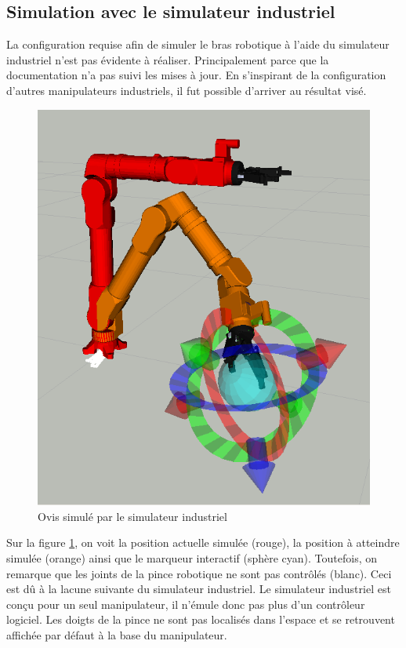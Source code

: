 \subsection{Simulation avec le simulateur industriel}
La configuration requise afin de simuler le bras robotique à l'aide du simulateur industriel n'est pas évidente à réaliser. Principalement parce que la documentation n'a pas suivi les mises à jour. En s'inspirant de la configuration d'autres manipulateurs industriels, il fut possible d'arriver au résultat visé.

\begin{figure}[H]
    \centering
    \includegraphics[scale=0.5]{Figures/ovis_moveit_industrial_sim}
    \caption{Ovis simulé par le simulateur industriel}
    \label{fig:ovis_industrial_sim}
\end{figure}

Sur la figure \ref{fig:ovis_industrial_sim}, on voit la position actuelle simulée (rouge), la position à atteindre simulée (orange) ainsi que le marqueur interactif (sphère cyan). Toutefois, on remarque que les joints de la pince robotique ne sont pas contrôlés (blanc). Ceci est dû à la lacune suivante du simulateur industriel. Le simulateur industriel est conçu pour un seul manipulateur, il n'émule donc pas plus d'un contrôleur logiciel. Les doigts de la pince ne sont pas localisés dans l'espace et se retrouvent affichée par défaut à la base du manipulateur.

